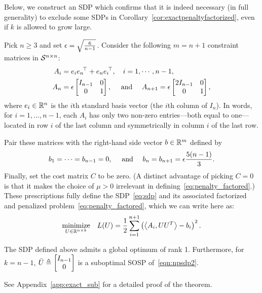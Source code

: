 
Below, we construct an SDP which confirms that it is indeed necessary (in full generality) to exclude some SDPs in Corollary~\ref{cor:exactpenaltyfactorized}, even if $k$ is allowed to grow large.

Pick $n \geq 3$ and set $\epsilon = \sqrt{\frac{6}{n-1}}$. Consider the following $m = n+1$ constraint matrices in $\mathcal{S}^{n\times n}$:
\begin{align*}
A_i & = e_i {e_{n}}^{\!\top} + e_{n} {e_{i}}^{\!\top}, \quad i = 1, \cdots, n-1, \\
A_{n} & = \epsilon \begin{bmatrix}
I_{n-1} & 0 \\ 0 & 1
\end{bmatrix}, \quad \mbox{ and } \quad 
A_{n+1} = \epsilon \begin{bmatrix}
2I_{n-1} & 0 \\ 0 & 1
\end{bmatrix},
\end{align*}
where $e_i \in \mathbb{R}^n$ is the $i$th standard basis vector (the $i$th column of $I_n$).
In words, for $i = 1, \ldots, n-1$, each $A_i$ has only two non-zero entries---both equal to one---located in row $i$ of the last column and symmetrically in column $i$ of the last row.

Pair these matrices with the right-hand side vector $b \in \mathbb{R}^m$ defined by
\begin{align*}
	b_1 = \cdots = b_{n-1} = 0, \quad \textrm{ and } \quad  b_{n} = b_{n+1} = \epsilon \frac{5(n-1)}{3}.
\end{align*}
Finally, set the cost matrix $C$ to be zero. (A distinct advantage of picking $C = 0$ is that it makes the choice of $\mu > 0$ irrelevant in defining~\eqref{eq:penalty_factored}.) These prescriptions fully define the SDP~\eqref{eq:sdp} and its associated factorized and penalized problem~\eqref{eq:penalty_factored}, which we can write here as:
\begin{align}
	\underset{U \in \mathbb{R}^{n\times k}}{\operatorname*{\mathrm{minimize}}} \quad L(U) = \frac{1}{2} \sum_{i=1}^{n+1} \left(\left\langle A_i, UU^T \right\rangle - b_i\right)^2. \label{eqn:npsdp2}
\end{align}
\begin{theorem}\label{thm:bad_sdp}
	The SDP defined above admits a global optimum of rank 1. Furthermore, for $k = n-1$, $\bar U \triangleq \begin{bmatrix}I_{n-1} \\ 0 \end{bmatrix}$ is a suboptimal SOSP of~\eqref{eqn:npsdp2}.
\end{theorem}
See Appendix~\ref{app:exact_sub} for a detailed proof of the theorem. 